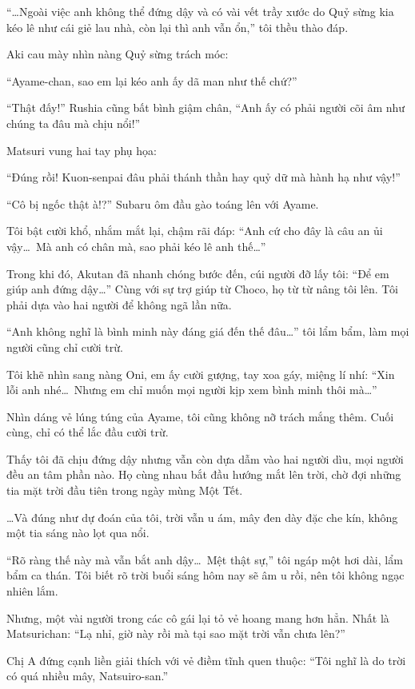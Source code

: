 \documentclass[../main.tex]{subfiles}
\begin{document}
``\dots Ngoài việc anh không thể đứng dậy và có vài vết trầy xước do Quỷ sừng kia kéo lê như cái giẻ lau nhà, còn lại thì anh vẫn ổn,'' tôi thều thào đáp.

Aki cau mày nhìn nàng Quỷ sừng trách móc:

``Ayame-chan, sao em lại kéo anh ấy dã man như thế chứ?''

``Thật đấy!'' Rushia cũng bất bình giậm chân, ``Anh ấy có phải người cõi âm như chúng ta đâu mà chịu nổi!''

Matsuri vung hai tay phụ họa:

``Đúng rồi! Kuon-senpai đâu phải thánh thần hay quỷ dữ mà hành hạ như vậy!''

``Cô bị ngốc thật à!?'' Subaru ôm đầu gào toáng lên với Ayame.

Tôi bật cười khổ, nhắm mắt lại, chậm rãi đáp: ``Anh cứ cho đây là câu an ủi vậy\dots\ Mà anh có chân mà, sao phải kéo lê anh thế\dots''

Trong khi đó, Akutan đã nhanh chóng bước đến, cúi người đỡ lấy tôi: ``Để em giúp anh đứng dậy\dots'' Cùng với sự trợ giúp từ Choco, họ từ từ nâng tôi lên. Tôi phải dựa vào hai người để không ngã lần nữa.

``Anh không nghĩ là bình minh này đáng giá đến thế đâu\dots'' tôi lẩm bẩm, làm mọi người cũng chỉ cười trừ.

Tôi khẽ nhìn sang nàng Oni, em ấy cười gượng, tay xoa gáy, miệng lí nhí: ``Xin lỗi anh nhé\dots\ Nhưng em chỉ muốn mọi người kịp xem bình minh thôi mà\dots''

Nhìn dáng vẻ lúng túng của Ayame, tôi cũng không nỡ trách mắng thêm. Cuối cùng, chỉ có thể lắc đầu cười trừ.

Thấy tôi đã chịu đứng dậy nhưng vẫn còn dựa dẫm vào hai người dìu, mọi người đều an tâm phần nào. Họ cùng nhau bắt đầu hướng mắt lên trời, chờ đợi những tia mặt trời đầu tiên trong ngày mùng Một Tết.

\dots Và đúng như dự đoán của tôi, trời vẫn u ám, mây đen dày đặc che kín, không một tia sáng nào lọt qua nổi.

``Rõ ràng thế này mà vẫn bắt anh dậy\dots\ Mệt thật sự,'' tôi ngáp một hơi dài, lẩm bẩm ca thán. Tôi biết rõ trời buổi sáng hôm nay sẽ âm u rồi, nên tôi không ngạc nhiên lắm.

Nhưng, một vài người trong các cô gái lại tỏ vẻ hoang mang hơn hẳn. Nhất là Matsurichan: ``Lạ nhỉ, giờ này rồi mà tại sao mặt trời vẫn chưa lên?''

Chị A đứng cạnh liền giải thích với vẻ điềm tĩnh quen thuộc: ``Tôi nghĩ là do trời có quá nhiều mây, Natsuiro-san.''
\end{document}

